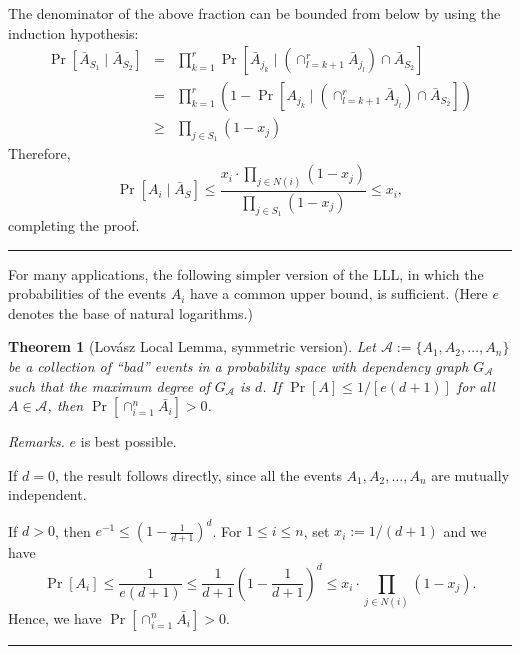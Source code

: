 \documentclass[twoside]{article}
\newcounter{lecnum}
\newtheorem{theorem}{Theorem}[lecnum]
\newenvironment{proof}{{\it Proof.}}{\hfill\rule{2mm}{2mm}}
\begin{document}
\begin{proof}
The denominator of the above fraction can be bounded from below by using the induction hypothesis:
\begin{eqnarray*}
\Pr[\bar{A}_{S_1}\mid\bar{A}_{S_2}]&=&\prod_{k=1}^{r}\Pr[\bar{A}_{j_k}\mid(\cap_{l=k+1}^{r}\bar{A}_{j_l})\cap\bar{A}_{S_2}]\\
&=&\prod_{k=1}^{r}(1-\Pr[A_{j_k}\mid(\cap_{l=k+1}^{r}\bar{A}_{j_l})\cap\bar{A}_{S_2}])\\
&\geq&\prod_{j\in S_1}(1-x_j)
\end{eqnarray*}
Therefore,
$$\Pr[A_i\mid\bar{A}_S]\leq \frac{x_i\cdot\prod_{j\in N(i)}(1-x_j)}{\prod_{j\in S_1}(1-x_j)}\leq x_i,$$
completing the proof.
\end{proof}

For many applications, the following simpler version of the LLL, in which the probabilities of the events $A_i$ have a common upper bound, is sufficient. (Here $e$ denotes the base of natural logarithms.)

\begin{theorem}[Lov\'{a}sz Local Lemma, symmetric version] Let $\mathcal{A}:=\{A_1,A_2,\dots,A_n\}$ be a collection of ``bad'' events in a probability space with dependency graph $G_{\mathcal{A}}$ such that the maximum degree of $G_{\mathcal{A}}$ is $d$. If $\Pr[A]\leq 1/[e(d+1)]$ for all $A\in\mathcal{A}$, then $\Pr[\cap_{i=1}^{n}\bar{A_i}]>0$.
\end{theorem}

\emph{Remarks.} $e$ is best possible.

\begin{proof}
If $d=0$, the result follows directly, since all the events $A_1,A_2,\dots,A_n$ are mutually independent.

If $d>0$, then $e^{-1}\leq (1-\frac{1}{d+1})^d$. For $1\leq i\leq n$, set $x_i:=1/(d+1)$ and we have
$$\Pr[A_i]\leq \frac{1}{e(d+1)}\leq \frac{1}{d+1}(1-\frac{1}{d+1})^d\leq x_i\cdot\prod_{j\in N(i)}(1-x_j).$$
Hence, we have $\Pr[\cap_{i=1}^{n}\bar{A_i}]>0$.
\end{proof}
\end{document}
